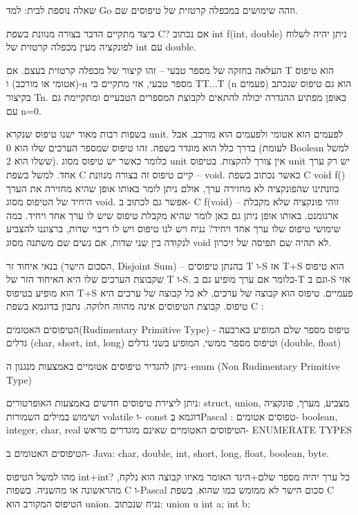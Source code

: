       שאלה נוספת לבית: למד Go וזהה שימושים במכפלה קרטזית של טיפוסים שם.

      כיצד מתקיים הדבר בצורה מנוונת בשפת C?
      אם נכתוב int f(int, double) ניתן יהיה לשלוח לפונקציה מעין מכפלה קרטזית של int עם double.

      \begin{ציינון}
\item העלאה בחזקה של מספר טבעי – זהו קיצור של מכפלה קרטזית בעצם. אם T הוא טיפוס (אטומי או מורכב) ו-n מספר טבעי, אזי מתקיים כי TT...T (n פעמים) הוא גם טיפוס שנכתב בקיצור Tn.
      באופן מפתיע ההגדרה יכולה להתאים לקבוצת המספרים הטבעיים ומתקיימת גם עם n=0.
\item בשפות רבות מאוד ישנו טיפוס שנקרא unit. לפעמים הוא אטומי ולפעמים הוא מורכב, אבל בדרך כלל הוא מוגדר בשפה. זהו טיפוס שמספר הערכים שלו הוא 0 (לעומת Boolean למשל ששלו הוא 2). כלומר כאשר יש טיפוס מסוג unit אין צורך להקצות.
      בטיפוס unit יש רק ערך אחד. למשל בשפת C קיים טיפוס זה בצורה מנוונת – void. כאשר נכתוב בשפת C void f(){} כוונתינו שהפונקציה לא מחזירה ערך, אולם ניתן לומר באותו אופן שהיא מחזירה את הערך היחיד של הטיפוס מסוג void. אפשר גם לכתוב ב- C f(void) – זוהי פונקציה שלא מקבלת ארגומנט. באותו אופן ניתן גם כאן לומר שהיא מקבלת טיפוס שיש לו ערך אחד ויחיד.
      במה שימושי טיפוס שלו ערך אחד ויחיד?
      נניח ויש לנו טיפוס ויש לו ריבוי שדות, ברצוננו להצביע לנקודה בין שני שדות, אם נשים שם משתנה מסוג void לא תהיה שם תפיסה של זיכרון.
\item בנאי איחוד זר (הסכום הישר, Disjoint Sum) – בהנתן טיפוסים T ו-S אז T+S הוא טיפוס שקבוצת הערכים שלו היא האיחוד הזר של T ו-S. כלומר אם ערך מופיע גם ב-T וגם ב-S אזי הוא מופיע בטיפוס T+S פעמיים. טיפוס הוא קבוצה של ערכים, לא כל קבוצה של ערכים היא טיפוס.
      קבוצת הטיפוסים אינה מהווה חלוקה.
      נתבון בדוגמא בשפת C :
\item הטיפוסים האטומים(Rudimentary Primitive Type) - טיפוס מספר שלם המופיע בארבעה גדלים (char, short, int, long) וטיפוס מספר ממשי, המופיע בשני גדלים
      (double, float)
\item ניתן להגדיר טיפוסים אטומיים באמצעות מנגנון ה--enum
      (Non Rudimentary Primitive Type)
\item ניתן ליצירת טיפוסים חדשים באמצעות האופרטורים: struct, union, מצביע, מערך, פונקציה ושימוש במילים השמורות volatile ו- const
      דוגמא בְּPascal :
      טפוסים אטומים- boolean, integer, char, real
      הטיפוסים האטומיים שאינם מוגדרים מראש- ENUMERATE TYPES
  \end{ציינון}

      הטיפוסים האטומים ב- Java:
      char, double, int, short, long, float, boolean, byte.
      \begin{ציינון}
\item 
      מהו למשל הטיפוס int+int? כל ערך יהיה מספר שלם+היגד האומר מאיזו קבוצה הוא נלקח, מהראשונה או מהשניה. בשפות C ו-Pascal סכום הישר לא ממומש כמו שהוא. בשפת C הטיפוס המקורב הוא union. נניח שנכתוב:
      union u{
        int a;
        int b;
      }
  \end{ציינון}

